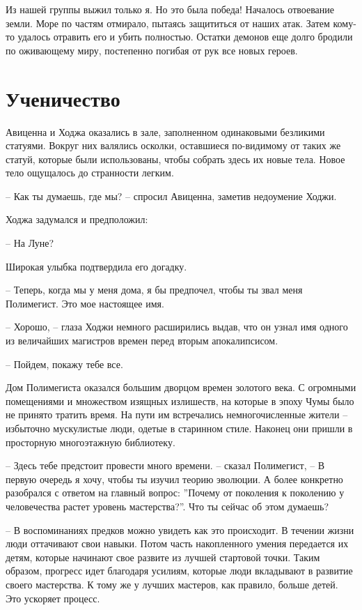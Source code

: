 \documentclass[12pt,a4paper]{article}
\begin{document}
Из нашей группы выжил только я. Но это была победа! Началось отвоевание земли. Море по частям отмирало, пытаясь защититься от наших атак. Затем кому-то удалось отравить его и убить полностью. Остатки демонов еще долго бродили по оживающему миру, постепенно погибая от рук все новых героев.

\section*{Ученичество}

Авиценна и Ходжа оказались в зале, заполненном одинаковыми безликими статуями. Вокруг них валялись осколки, оставшиеся по-видимому от таких же статуй, которые были использованы, чтобы собрать здесь их новые тела. Новое тело ощущалось до странности легким.

-- Как ты думаешь, где мы? -- спросил Авиценна, заметив недоумение Ходжи.

Ходжа задумался и предположил:

-- На Луне?

Широкая улыбка подтвердила его догадку.

-- Теперь, когда мы у меня дома, я бы предпочел, чтобы ты звал меня Полимегист. Это мое настоящее имя.

-- Хорошо, -- глаза Ходжи немного расширились выдав, что он узнал имя одного из величайших магистров времен перед вторым апокалипсисом.

-- Пойдем, покажу тебе все.

Дом Полимегиста оказался большим дворцом времен золотого века. С огромными помещениями и множеством изящных излишеств, на которые в эпоху Чумы было не принято тратить время. На пути им встречались немногочисленные жители -- избыточно мускулистые люди, одетые в старинном стиле. Наконец они пришли в просторную многоэтажную библиотеку.

-- Здесь тебе предстоит провести много времени. -- сказал Полимегист, -- В первую очередь я хочу, чтобы ты изучил теорию эволюции. А более конкретно разобрался с ответом на главный вопрос: ''Почему от поколения к поколению у человечества растет уровень мастерства?''. Что ты сейчас об этом думаешь?

-- В воспоминаниях предков можно увидеть как это происходит. В течении жизни люди оттачивают свои навыки. Потом часть накопленного умения передается их детям, которые начинают свое развите из лучшей стартовой точки. Таким образом, прогресс идет благодаря усилиям, которые люди вкладывают в развитие своего мастерства. К тому же у лучших мастеров, как правило, больше детей. Это ускоряет процесс.
\end{document}
